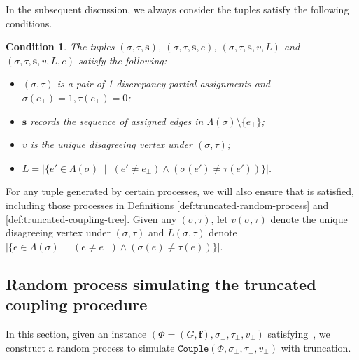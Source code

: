 \documentclass[11pt]{article}
\newtheorem{condition}{Condition}
\newcommand{\abs}[1]{\left\vert#1\right\vert}
\renewcommand{\mid}{\;\middle\vert\;} \newcommand{\cmid}{\,:\,}
\def\!#1{\mathtt{#1}}
\newcommand{\vecf}{\boldsymbol{f}}
\newcommand{\seqS}{\boldsymbol{s}}
\begin{document}
In the subsequent discussion, we always consider the tuples satisfy the following conditions.
\begin{condition}\label{condition-sigma-tau}
The tuples $(\sigma,\tau,\seqS)$, $(\sigma,\tau,\seqS,e)$,  $(\sigma,\tau,\seqS, v, L)$ and $(\sigma,\tau,\seqS, v, L,e)$ satisfy the following:
\begin{itemize}
\item $(\sigma, \tau)$ is a pair of 1-discrepancy partial assignments and $\sigma(e_\bot) = 1, \tau(e_\bot) = 0$;
\item $\seqS$ records the sequence of assigned edges in $\Lambda(\sigma)\setminus \{e_\bot\}$;
\item $v$ is the unique disagreeing vertex under $(\sigma, \tau)$;
\item $L = \abs{\{e'\in \Lambda(\sigma)\mid (e'\neq e_{\bot})\land (\sigma(e')\neq \tau(e'))\}}$.
\end{itemize}
\end{condition}
For any tuple generated by certain processes, we will also ensure that  is satisfied, including those processes in Definitions  \ref{def:truncated-random-process} and \ref{def:truncated-coupling-tree}.
Given any $(\sigma,\tau)$, let $v(\sigma,\tau)$ denote the unique disagreeing vertex under $(\sigma, \tau)$ and $L(\sigma,\tau)$ denote $\abs{\{e\in \Lambda(\sigma)\mid (e\neq e_{\bot})\land (\sigma(e)\neq \tau(e))\}}$.
    

\subsection{Random process simulating the truncated coupling procedure}

In this section, given an instance $(\Phi = (G, \vecf), \sigma_\bot, \tau_\bot, v_\bot)$ satisfying~, we construct a random process to simulate $\!{Couple}(\Phi, \sigma_\bot, \tau_\bot, v_\bot)$ with truncation.
\end{document}
